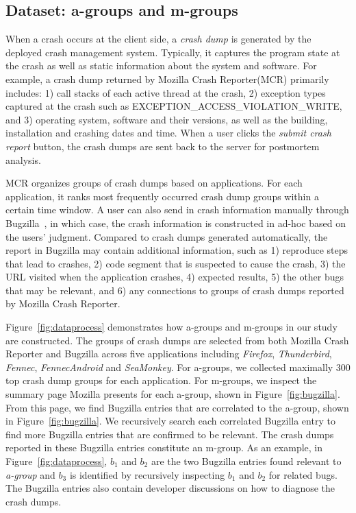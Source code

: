 \documentclass{llncs}
\newcommand{\todo}[1]{\textcolor{cyan}{\textbf{[#1]}}}
\begin{document}



\subsection{Dataset: a-groups and m-groups}
When a crash occurs at the client side, a {\it crash dump} is generated by the deployed crash management system. Typically, it captures the program state at the crash as well as static information about the system and software. For example, a crash dump returned by Mozilla Crash Reporter(MCR) primarily includes: 1) call stacks of each active thread at the crash, 2) exception types captured at the crash such as EXCEPTION\_ACCESS\_VIOLATION\_WRITE, and 3) operating system, software and their versions, as well as the building, installation and crashing dates and time.  When a user clicks the {\it submit crash report} button, the crash dumps are sent back to the server for postmortem analysis.

MCR organizes groups of crash dumps based on applications. For each application, it ranks most frequently occurred crash dump groups within a certain time window. A user can also send in crash information manually through Bugzilla~\cite{bugzilla}, in which case, the crash information is constructed in ad-hoc based on the users' judgment. Compared to crash dumps generated automatically, the report in Bugzilla may contain additional information, such as 1) reproduce steps that lead to crashes, 2) code segment that is suspected to cause the crash, 3) the URL visited when the application crashes, 4) expected results, 5) the other bugs that may be relevant, and 6) any connections to groups of crash dumps reported by Mozilla Crash Reporter.

Figure~\ref{fig:dataprocess} demonstrates how a-groups and m-groups in our study are constructed. The groups of crash dumps are selected from both Mozilla Crash Reporter and Bugzilla across five applications including {\it Firefox}, {\it Thunderbird}, {\it Fennec}, {\it FennecAndroid} and {\it SeaMonkey}. For a-groups, we collected maximally 300 top crash dump groups for each application. For m-groups, we inspect the summary page Mozilla presents for each a-group, shown in Figure~\ref{fig:bugzilla}. From this page, we find Bugzilla entries that are correlated to the a-group, shown in Figure~\ref{fig:bugzilla}. We recursively search each correlated Bugzilla entry to find more Bugzilla entries that are confirmed to be relevant. The crash dumps reported in these Bugzilla entries constitute an m-group. As an example, in Figure~\ref{fig:dataprocess}, $b_1$ and $b_2$ are the two Bugzilla entries found relevant to {\it a-group} and $b_3$ is identified by recursively inspecting $b_1$ and $b_2$ for related bugs. The Bugzilla entries also contain developer discussions on how to diagnose the crash dumps.
\end{document}

